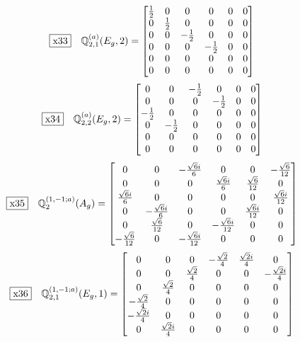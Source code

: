\documentclass[fleqn,10pt,landscape]{jsarticle}
\begin{document}
\begin{dmath*}
\fbox{x33}\quad \mathbb{Q}_{2,1}^{(a)}(E_{g},2)=\begin{bmatrix} \frac{1}{2} & 0 & 0 & 0 & 0 & 0 \\ 0 & \frac{1}{2} & 0 & 0 & 0 & 0 \\ 0 & 0 & - \frac{1}{2} & 0 & 0 & 0 \\ 0 & 0 & 0 & - \frac{1}{2} & 0 & 0 \\ 0 & 0 & 0 & 0 & 0 & 0 \\ 0 & 0 & 0 & 0 & 0 & 0 \end{bmatrix}
\end{dmath*}
\begin{dmath*}
\fbox{x34}\quad \mathbb{Q}_{2,2}^{(a)}(E_{g},2)=\begin{bmatrix} 0 & 0 & - \frac{1}{2} & 0 & 0 & 0 \\ 0 & 0 & 0 & - \frac{1}{2} & 0 & 0 \\ - \frac{1}{2} & 0 & 0 & 0 & 0 & 0 \\ 0 & - \frac{1}{2} & 0 & 0 & 0 & 0 \\ 0 & 0 & 0 & 0 & 0 & 0 \\ 0 & 0 & 0 & 0 & 0 & 0 \end{bmatrix}
\end{dmath*}
\begin{dmath*}
\fbox{x35}\quad \mathbb{Q}_{2}^{(1,-1;a)}(A_{g})=\begin{bmatrix} 0 & 0 & - \frac{\sqrt{6} i}{6} & 0 & 0 & - \frac{\sqrt{6}}{12} \\ 0 & 0 & 0 & \frac{\sqrt{6} i}{6} & \frac{\sqrt{6}}{12} & 0 \\ \frac{\sqrt{6} i}{6} & 0 & 0 & 0 & 0 & \frac{\sqrt{6} i}{12} \\ 0 & - \frac{\sqrt{6} i}{6} & 0 & 0 & \frac{\sqrt{6} i}{12} & 0 \\ 0 & \frac{\sqrt{6}}{12} & 0 & - \frac{\sqrt{6} i}{12} & 0 & 0 \\ - \frac{\sqrt{6}}{12} & 0 & - \frac{\sqrt{6} i}{12} & 0 & 0 & 0 \end{bmatrix}
\end{dmath*}
\begin{dmath*}
\fbox{x36}\quad \mathbb{Q}_{2,1}^{(1,-1;a)}(E_{g},1)=\begin{bmatrix} 0 & 0 & 0 & - \frac{\sqrt{2}}{4} & \frac{\sqrt{2} i}{4} & 0 \\ 0 & 0 & \frac{\sqrt{2}}{4} & 0 & 0 & - \frac{\sqrt{2} i}{4} \\ 0 & \frac{\sqrt{2}}{4} & 0 & 0 & 0 & 0 \\ - \frac{\sqrt{2}}{4} & 0 & 0 & 0 & 0 & 0 \\ - \frac{\sqrt{2} i}{4} & 0 & 0 & 0 & 0 & 0 \\ 0 & \frac{\sqrt{2} i}{4} & 0 & 0 & 0 & 0 \end{bmatrix}
\end{dmath*}
\end{document}
